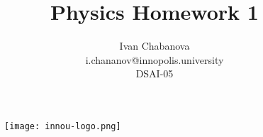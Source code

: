 \begin{titlepage}

    \thispagestyle{empty} %

    \begin{figure}[t]
        \centering
        \texttt{[image: innou-logo.png]} %
    \end{figure}
    
    \title{Physics Homework 1}
    \author{Ivan Chabanova\\i.chananov@innopolis.university\\DSAI-05}

    \maketitle



\end{titlepage}